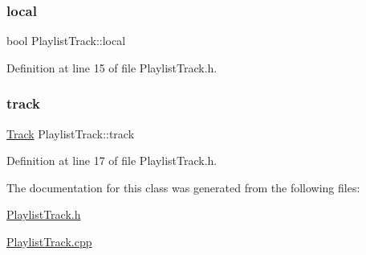 \subsubsection{\texorpdfstring{local}{local}}
{\footnotesize\ttfamily bool Playlist\+Track\+::local\hspace{0.3cm}{\ttfamily [private]}}



Definition at line 15 of file Playlist\+Track.\+h.

\mbox{\label{class_playlist_track_a34b14728e12dcf181899b7eaa7ac7f81}} 
\subsubsection{\texorpdfstring{track}{track}}
{\footnotesize\ttfamily \mbox{\hyperlink{class_track}{Track}} Playlist\+Track\+::track\hspace{0.3cm}{\ttfamily [private]}}



Definition at line 17 of file Playlist\+Track.\+h.



The documentation for this class was generated from the following files\+:\begin{DoxyCompactItemize}
\item 
\mbox{\hyperlink{_playlist_track_8h}{Playlist\+Track.\+h}}\item 
\mbox{\hyperlink{_playlist_track_8cpp}{Playlist\+Track.\+cpp}}\end{DoxyCompactItemize}
